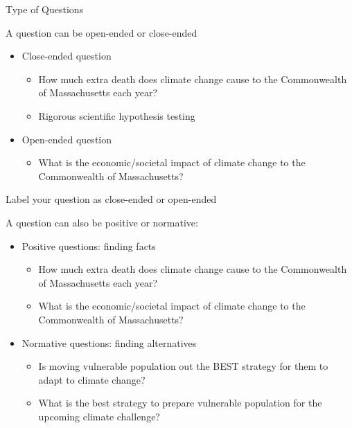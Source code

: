 \begin{frame}{Type of Questions}
\protect\hypertarget{type-of-questions}{}

A question can be open-ended or close-ended

\begin{itemize}
\tightlist
\item
  Close-ended question

  \begin{itemize}
  \tightlist
  \item
    How much extra death does climate change cause to the Commonwealth
    of Massachusetts each year?
  \item
    Rigorous scientific hypothesis testing
  \end{itemize}
\item
  Open-ended question

  \begin{itemize}
  \tightlist
  \item
    What is the economic/societal impact of climate change to the
    Commonwealth of Massachusetts?
  \end{itemize}
\end{itemize}

\end{frame}

\begin{frame}{Label your question as close-ended or open-ended}
\protect\hypertarget{label-your-question-as-close-ended-or-open-ended}{}

\end{frame}

\begin{frame}{}
\protect\hypertarget{section-1}{}

A question can also be positive or normative:

\begin{itemize}
\tightlist
\item
  Positive questions: finding facts

  \begin{itemize}
  \tightlist
  \item
    How much extra death does climate change cause to the Commonwealth
    of Massachusetts each year?
  \item
    What is the economic/societal impact of climate change to the
    Commonwealth of Massachusetts?
  \end{itemize}
\item
  Normative questions: finding alternatives

  \begin{itemize}
  \tightlist
  \item
    Is moving vulnerable population out the BEST strategy for them to
    adapt to climate change?
  \item
    What is the best strategy to prepare vulnerable population for the
    upcoming climate challenge?
  \end{itemize}
\end{itemize}

\end{frame}

